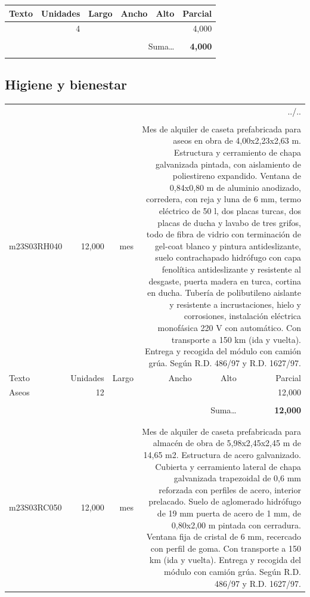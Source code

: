 \documentclass{book}%
\begin{document}
\begin{longtable}{lrrrrr}
Texto&Unidades&Largo&Ancho&Alto&Parcial\\%
\hline%
\multicolumn{1}{p{3.5cm}}{ }&4&&&&     4,000\\%
&&&&&\\%
\multicolumn{5}{r}{Suma\ldots}&\textbf{     4,000}\\%
\hline%
&&&&&\\%
\end{longtable}%
\newpage

%
\subsection{Higiene y bienestar}%
\begin{longtable}{lrrrrr}%
\multicolumn{6}{r}{../..}\\%
\endfoot%
\endlastfoot%
&&&&&\\%
m23S03RH040&    12,000& mes&\multicolumn{3}{p{6cm}}{\scriptsize Mes de alquiler de caseta prefabricada para aseos en obra de 4,00x2,23x2,63 m. Estructura y cerramiento de chapa galvanizada pintada, con aislamiento de poliestireno expandido. Ventana de 0,84x0,80 m de aluminio anodizado, corredera, con reja y luna de 6 mm, termo eléctrico de 50 l, dos placas turcas, dos placas de ducha y lavabo de tres grifos, todo de fibra de vidrio con terminación de gel-coat blanco y pintura antideslizante, suelo contrachapado hidrófugo con capa fenolítica antideslizante y resistente al desgaste, puerta madera en turca, cortina en ducha. Tubería de polibutileno aislante y resistente a incrustaciones, hielo y corrosiones, instalación eléctrica monofásica 220 V con automático. Con transporte a 150 km (ida y vuelta). Entrega y recogida del módulo con camión grúa. Según R.D. 486/97 y R.D. 1627/97.\normalsize}\\%
Texto&Unidades&Largo&Ancho&Alto&Parcial\\%
\hline%
\multicolumn{1}{p{3.5cm}}{Aseos}&12&&&&    12,000\\%
&&&&&\\%
\multicolumn{5}{r}{Suma\ldots}&\textbf{    12,000}\\%
\hline%
&&&&&\\%
&&&&&\\%
m23S03RC050&    12,000& mes&\multicolumn{3}{p{6cm}}{\scriptsize Mes de alquiler de caseta prefabricada para almacén de obra de 5,98x2,45x2,45 m de 14,65 m2. Estructura de acero galvanizado. Cubierta y cerramiento lateral de chapa galvanizada trapezoidal de 0,6 mm reforzada con perfiles de acero, interior prelacado. Suelo de aglomerado hidrófugo de 19 mm puerta de acero de 1 mm, de 0,80x2,00 m pintada con cerradura. Ventana fija de cristal de 6 mm, recercado con perfil de goma. Con transporte a 150 km (ida y vuelta). Entrega y recogida del módulo con camión grúa. Según R.D. 486/97 y R.D. 1627/97.\normalsize}\\%

\end{longtable}
\end{document}
